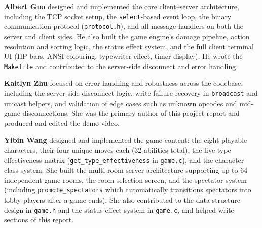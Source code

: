 \documentclass[11pt,letterpaper]{article}
\begin{document}
\textbf{Albert Guo} designed and implemented the core client--server architecture, including the TCP socket setup, the \texttt{select}-based event loop, the binary communication protocol (\texttt{protocol.h}), and all message handlers on both the server and client sides. He also built the game engine's damage pipeline, action resolution and sorting logic, the status effect system, and the full client terminal UI (HP bars, ANSI colouring, typewriter effect, timer display). He wrote the \texttt{Makefile} and contributed to the server-side disconnect and error handling.

\textbf{Kaitlyn Zhu} focused on error handling and robustness across the codebase, including the server-side disconnect logic, write-failure recovery in \texttt{broadcast} and unicast helpers, and validation of edge cases such as unknown opcodes and mid-game disconnections. She was the primary author of this project report and produced and edited the demo video.

\textbf{Yibin Wang} designed and implemented the game content: the eight playable characters, their four unique moves each (32 abilities total), the five-type effectiveness matrix (\texttt{get\_type\_effectiveness} in \texttt{game.c}), and the character class system. She built the multi-room server architecture supporting up to 64 independent game rooms, the room-selection screen, and the spectator system (including \texttt{promote\_spectators} which automatically transitions spectators into lobby players after a game ends). She also contributed to the data structure design in \texttt{game.h} and the status effect system in \texttt{game.c}, and helped write sections of this report.
\end{document}
